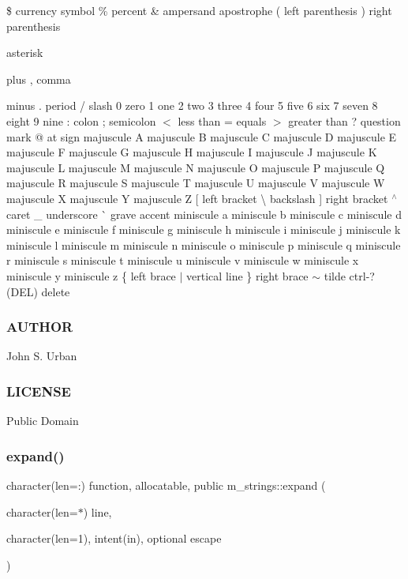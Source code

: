 \$ currency symbol \% percent \& ampersand \textquotesingle{} apostrophe ( left parenthesis ) right parenthesis
\begin{DoxyItemize}
\item asterisk
\item plus , comma
\item minus . period / slash 0 zero 1 one 2 two 3 three 4 four 5 five 6 six 7 seven 8 eight 9 nine \+: colon ; semicolon $<$ less than = equals $>$ greater than ? question mark @ at sign majuscule A majuscule B majuscule C majuscule D majuscule E majuscule F majuscule G majuscule H majuscule I majuscule J majuscule K majuscule L majuscule M majuscule N majuscule O majuscule P majuscule Q majuscule R majuscule S majuscule T majuscule U majuscule V majuscule W majuscule X majuscule Y majuscule Z \mbox{[} left bracket \textbackslash{} backslash \mbox{]} right bracket $^\wedge$ caret \+\_\+ underscore \`{} grave accent miniscule a miniscule b miniscule c miniscule d miniscule e miniscule f miniscule g miniscule h miniscule i miniscule j miniscule k miniscule l miniscule m miniscule n miniscule o miniscule p miniscule q miniscule r miniscule s miniscule t miniscule u miniscule v miniscule w miniscule x miniscule y miniscule z \{ left brace $\vert$ vertical line \} right brace $\sim$ tilde ctrl-\/? (D\+EL) delete \subsubsection*{A\+U\+T\+H\+OR}
\end{DoxyItemize}

John S. Urban \subsubsection*{L\+I\+C\+E\+N\+SE}

Public Domain \mbox{\label{namespacem__strings_a33b248107c1521272b55cda5c4077378}} 
\subsubsection{\texorpdfstring{expand()}{expand()}}
{\footnotesize\ttfamily character(len=\+:) function, allocatable, public m\+\_\+strings\+::expand (\begin{DoxyParamCaption}\item[{character(len=$\ast$)}]{line,  }\item[{character(len=1), intent(in), optional}]{escape }\end{DoxyParamCaption})}




